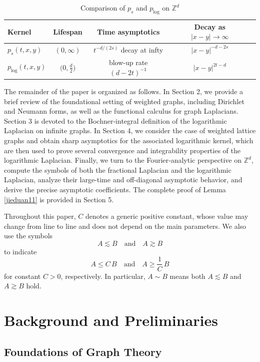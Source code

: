 \documentclass[reqno,12pt]{amsart}
\numberwithin{equation}{section}
\begin{document}
\begin{table}[ht]
	\centering
	\caption{Comparison of \(p_s\) and \(p_{\log}\) on \(\mathbb{Z}^d\)}
	\label{tab:Zd-kernels}
	\begin{tabular}{lcccc}
		\toprule
		Kernel & Lifespan & Time asymptotics & Decay as \(\lvert x-y\rvert\to\infty\) \\
		\midrule
		\(p_s(t,x,y)\)     & \((0,\infty)\)              & \(t^{-d/(2s)}\) decay at infty    & \(\lvert x-y\rvert^{-d-2s}\)  \\
		\(p_{\log}(t,x,y)\) & \(\bigl(0,\tfrac d2\bigr)\) & blow-up rate \((d-2t)^{-1}\)                      & \(\lvert x-y\rvert^{2t-d}\)   \\
		\bottomrule
	\end{tabular}
\end{table}


The remainder of the paper is organized as follows.  In Section 2, we provide a brief review of the foundational setting of weighted graphs, including Dirichlet and Neumann forms, as well as the functional calculus for graph Laplacians. Section 3 is devoted to the Bochner‐integral definition of the logarithmic Laplacian on infinite graphs.  In Section 4, we consider the case of weighted lattice graphs and obtain sharp asymptotics for the associated logarithmic kernel, which are then used to prove several convergence and integrability properties of the logarithmic Laplacian. Finally, we turn to the Fourier‐analytic perspective on $\mathbb{Z}^d$, compute the symbols of both the fractional Laplacian and the logarithmic Laplacian, analyze their large-time and off-diagonal asymptotic behavior, and derive the precise asymptotic coefficients. The complete proof of Lemma \ref{jieduan11} is provided in Section 5.


Throughout this paper, \(C\) denotes a generic positive constant, whose value may change from line to line and does not depend on the main parameters.  We also use the symbols
\[
A \lesssim B
\quad\text{and}\quad
A \gtrsim B
\]
to indicate
\[
A \le C\,B
\quad\text{and}\quad
A \ge \frac1C\,B
\]
for constant \(C>0\), respectively. In particular, \(A\sim B\) means both \(A\lesssim B\) and \(A\gtrsim B\) hold.


\section{Background and Preliminaries}

	
	\subsection{Foundations of Graph Theory}
\end{document}
